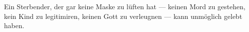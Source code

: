 Ein Sterbender, der gar keine Maske zu lüften hat — keinen Mord zu gestehen, kein Kind zu legitimiren, keinen Gott zu verleugnen — kann unmöglich gelebt haben.
\par

